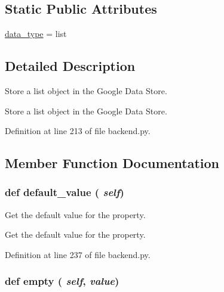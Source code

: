 \subsection*{Static Public Attributes}
\begin{DoxyCompactItemize}
\item 
\hyperlink{classbackend_1_1_generic_list_property_ac2ad7f431e3446fddcd9b6b9f93c4c14}{data\_\-type} = list
\end{DoxyCompactItemize}


\subsection{Detailed Description}
Store a list object in the Google Data Store. \begin{DoxyVerb}Store a list object in the Google Data Store.\end{DoxyVerb}
 

Definition at line 213 of file backend.py.



\subsection{Member Function Documentation}
\hypertarget{classbackend_1_1_generic_list_property_a64bfffc058d933b3b0599f5bc7c049d1}{
\subsubsection[{default\_\-value}]{\setlength{\rightskip}{0pt plus 5cm}def default\_\-value ( {\em self})}}
\label{classbackend_1_1_generic_list_property_a64bfffc058d933b3b0599f5bc7c049d1}


Get the default value for the property. 

\begin{DoxyVerb}Get the default value for the property.\end{DoxyVerb}
 

Definition at line 237 of file backend.py.

\hypertarget{classbackend_1_1_generic_list_property_aad7084fad37d1cf9b41a738ecfbbd249}{
\subsubsection[{empty}]{\setlength{\rightskip}{0pt plus 5cm}def empty ( {\em self}, \/   {\em value})}}
\label{classbackend_1_1_generic_list_property_aad7084fad37d1cf9b41a738ecfbbd249}


